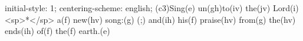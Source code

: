 initial-style: 1;
centering-scheme: english;
(c3)Sing(e) un(gh)to(iv) the(jv) Lord(i) <sp>*</sp> a(f) new(hv) song:(g) (;) and(ih) his(f) praise(hv) from(g) the(hv) ends(ih) of(f) the(f) earth.(e)
